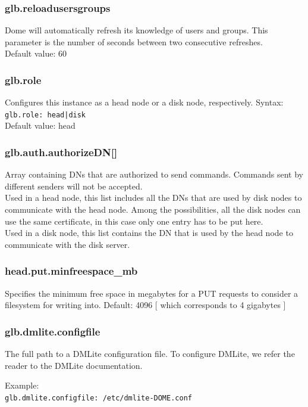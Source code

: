 \documentclass[a4paper,10pt]{scrreprt}
\begin{document}
\subsubsection{glb.reloadusersgroups}
Dome will automatically refresh its knowledge of users and groups. This parameter is the number of seconds between two consecutive refreshes.\\
Default value: 60\\

\subsubsection{glb.role}
Configures this instance as a head node or a disk node, respectively.
Syntax:\\
\lstinline"glb.role: head|disk"\\
Default value: head\\

\subsubsection{glb.auth.authorizeDN[]}
Array containing DNs that are authorized to send commands. Commands sent by different senders will not be accepted.\\
Used in a head node, this list includes all the DNs that are used by disk nodes to communicate with the head node. Among the possibilities, all the disk nodes can use the same certificate, in this case only one entry has to be put here.\\
Used in a disk node, this list contains the DN that is used by the head node to communicate with the disk server.\\

\subsubsection{head.put.minfreespace\_mb}
Specifies the minimum free space in megabytes for a PUT requests to consider a filesystem for writing into.
Default: 4096 [ which corresponds to 4 gigabytes ]

\subsubsection{glb.dmlite.configfile}


The full path to a DMLite configuration file. To configure DMLite, we refer the reader to the DMLite documentation.

 Example:\\
\lstinline"glb.dmlite.configfile: /etc/dmlite-DOME.conf"\\
\end{document}
